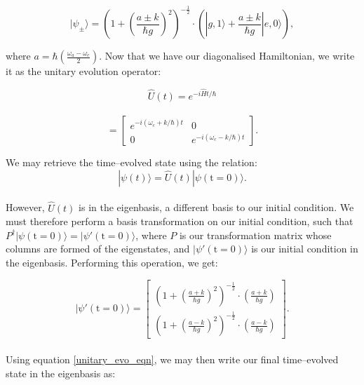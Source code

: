 \documentclass[11pt]{article}
\begin{document}
\begin{equation*}
    |\psi_\pm\rangle = \left(1 + \left(\frac{a\pm k}{\hbar g}\right)^2\right)^{-\frac{1}{2}} \cdot\left(|g,1\rangle + \frac{a\pm k}{\hbar g}|e,0\rangle\right),
\end{equation*}

where $a = \hbar\left(\frac{\omega_a - \omega_c}{2}\right)$. Now that we have our diagonalised Hamiltonian, we write it as the unitary evolution operator:

\begin{equation*}
    \hat{U}(t) = e^{-i\hat{H}t/\hbar}
\end{equation*}
\\ 
\begin{equation*}
    = 
    \begin{bmatrix}
        e^{-i(\omega_c + k/\hbar)t} & 0 \\
        0 & e^{-i(\omega_c - k/\hbar)t}
    \end{bmatrix}.
\end{equation*}

We may retrieve the time--evolved state using the relation:
\begin{equation} \label{unitary_evo_eqn}
    |\psi(t)\rangle = \hat{U}(t)|\psi(\text{t}=0)\rangle.
\end{equation}
\\
However, $\hat{U}(t)$ is in the eigenbasis, a different basis to our initial condition. We must therefore perform a basis transformation on our initial condition, such that $P^\dagger|\psi(\text{t} = 0)\rangle = |\psi'(\text{t} = 0)\rangle$, where $P$ is our transformation matrix whose columns are formed of the eigenstates, and $|\psi'(\text{t} = 0)\rangle$ is our initial condition in the eigenbasis. Performing this operation, we get:

\begin{equation*}
    |\psi'(\text{t} = 0)\rangle = 
    \begin{bmatrix}
        \left(1 + \left(\frac{a + k}{\hbar g}\right)^2\right)^{-\frac{1}{2}}\cdot\left(\frac{a + k}{\hbar g}\right) \\
        \left(1 + \left(\frac{a - k}{\hbar g}\right)^2\right)^{-\frac{1}{2}}\cdot\left(\frac{a - k}{\hbar g}\right)
    \end{bmatrix}.
\end{equation*}
\\
Using equation \eqref{unitary_evo_eqn}, we may then write our final time--evolved state in the eigenbasis as:
\end{document}

